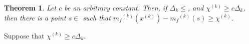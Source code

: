 \documentclass{article}
\newtheorem{theorem}{Theorem}[section]
\theoremstyle{case}
\newcommand{\xk}{{x^{(k)}}}
\newcommand{\dk}{\Delta_k}
\newcommand{\mfk}{{{m}_f}^{(k)}}
\newcommand{\chik}{{\chi^{(k)}}}
\newcommand{\gk}{{\nabla m_f^{(k)}(x^{(k)})}}
\newcommand{\gmcik}{{\nabla m_{c_i}(\xk)}}
\begin{document}
\subsubsection{}





\begin{theorem}
Let $c$ be an arbitrary constant.
Then, if $\dk \le $, and $\chik \ge c \dk$, then there is a point $s \in $ such that $\mfk(\xk) - \mfk(s) \ge \chik$.
\end{theorem}



Suppose that $\chik \ge c \dk$.



% 
% 
% 
% 
% 
% 



\end{document}
